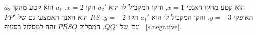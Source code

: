 $a_2$
הוא קטע מהקו האנכי 
$x=1$,
והקו המקביל לו הוא
$a_2'$
הקו
$x=2$.
$a_1$
הוא קטע מהקו האופקי 
$y=-3$,
והקו המקביל לו הוא
$a_1'$
הקו
$y=-2$.
$RS$
הוא האנך האמצעי גם של
$\overline{PP'}$
וגם של
$\overline{QQ'}$.
המסלול
$\overline{PRSQ}$
זהה למסלול בסעיף%
~\ref{s.negative}.
%
%
%
%
%
%
%
%

